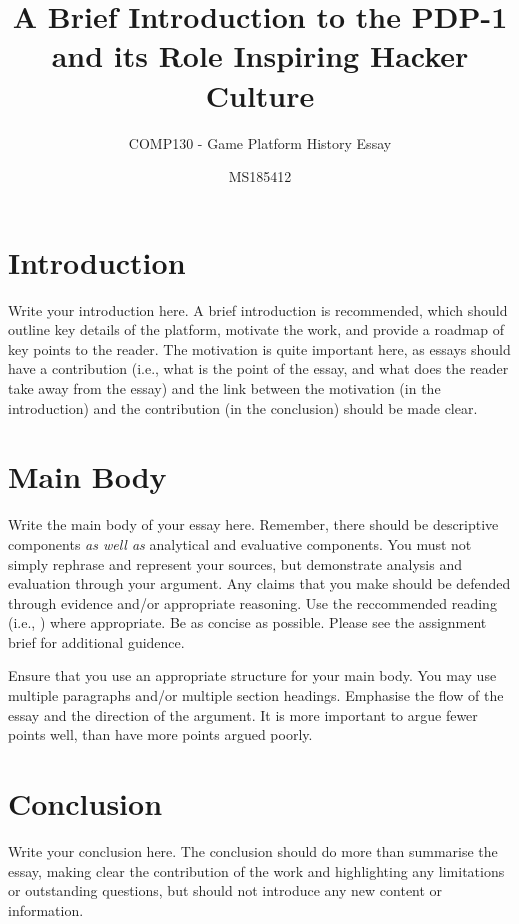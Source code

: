 \documentclass{scrartcl}
\title{A Brief Introduction to the PDP-1 and its Role Inspiring Hacker Culture}
\subtitle{COMP130 - Game Platform History Essay}
\author{MS185412}
\begin{document}
\maketitle


\section{Introduction}

Write your introduction here. A brief introduction is recommended, which should outline key details of the platform, motivate the work, and provide a roadmap of key points to the reader. The motivation is quite important here, as essays should have a contribution (i.e., what is the point of the essay, and what does the reader take away from the essay) and the link between the motivation (in the introduction) and the contribution (in the conclusion) should be made clear.

\section{Main Body}

Write the main body of your essay here. Remember, there should be descriptive components \textit{as well as} analytical and evaluative components. You must not simply rephrase and represent your sources, but demonstrate analysis and evaluation through your argument. Any claims that you make should be defended through evidence and/or appropriate reasoning. Use the reccommended reading (i.e., \cite{evans2006invisible}) where appropriate. Be as concise as possible. Please see the assignment brief for additional guidence. 

Ensure that you use an appropriate structure for your main body. You may use multiple paragraphs and/or multiple section headings. Emphasise the flow of the essay and the direction of the argument. It is more important to argue fewer points well, than have more points argued poorly.

\section{Conclusion}

Write your conclusion here. The conclusion should do more than summarise the essay, making clear the contribution of the work and highlighting any limitations or outstanding questions, but should not introduce any new content or information.



\end{document}
